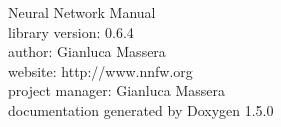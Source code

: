 \documentclass[a4paper]{book}
\begin{document}
\begin{titlepage}
\vspace*{7cm}
\begin{center}
{\Huge Neural Network Manual}\\
\vspace*{1cm}
{\large library version: 0.6.4}\\
{\large author: Gianluca Massera}\\
{\large website: http://www.nnfw.org}\\
{\large project manager: Gianluca Massera}\\
{\large documentation generated by Doxygen 1.5.0}\\
\end{center}
\end{titlepage}
\clearemptydoublepage


\tableofcontents
\clearemptydoublepage











\printindex
\end{document}
